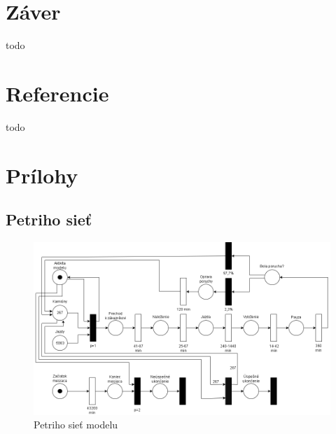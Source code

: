 \documentclass[a4paper, 11pt]{article}
\begin{document}
    \newpage
	\section{Záver}
	todo 

    \newpage
	\section{Referencie}
	todo

    \newpage
	\section{Prílohy}
    \subsection{Petriho sieť}
	\label{subsection:petri_net}
	\begin{figure}[!ht]
		\centering
		\vspace{1cm}
		\includegraphics[width=0.95\linewidth]{res/petri_net.png}
		\caption{Petriho sieť modelu}
		\label{figure:petri_net}
	\end{figure}
\end{document}
